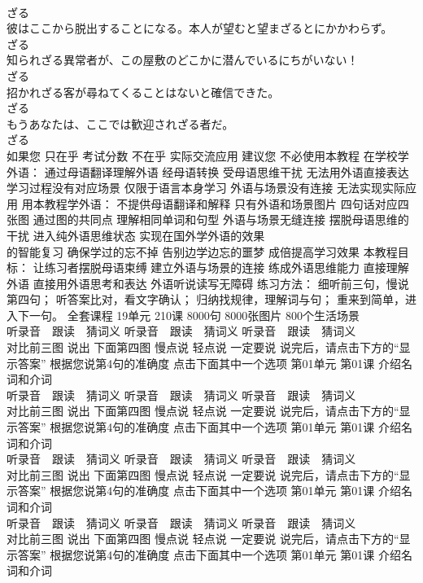 \documentclass[8pt]{extreport}
\begin{document}
\begin{CJK}{UTF8}{min}
\\	ざる
\\	彼はここから脱出することになる。本人が望むと望まざるとにかかわらず。	
\\	ざる
\\	知られざる異常者が、この屋敷のどこかに潜んでいるにちがいない！	
\\	ざる
\\	招かれざる客が尋ねてくることはないと確信できた。	
\\	ざる
\\	もうあなたは、ここでは歓迎されざる者だ。	
\\	ざる
\\	如果您 只在乎 考试分数 不在乎 实际交流应用 建议您 不必使用本教程 在学校学外语： 通过母语翻译理解外语 经母语转换 受母语思维干扰 无法用外语直接表达 学习过程没有对应场景 仅限于语言本身学习 外语与场景没有连接 无法实现实际应用 用本教程学外语： 不提供母语翻译和解释 只有外语和场景图片 四句话对应四张图 通过图的共同点 理解相同单词和句型 外语与场景无缝连接 摆脱母语思维的干扰 进入纯外语思维状态 实现在国外学外语的效果 
\\	的智能复习 确保学过的忘不掉 告别边学边忘的噩梦 成倍提高学习效果 本教程目标： 让练习者摆脱母语束缚 建立外语与场景的连接 练成外语思维能力 直接理解外语 直接用外语思考和表达 外语听说读写无障碍 练习方法： 细听前三句，慢说第四句； 听答案比对，看文字确认； 归纳找规律，理解词与句； 重来到简单，进入下一句。	全套课程 19单元 210课 8000句 8000张图片 800个生活场景
\\	听录音　跟读　猜词义 听录音　跟读　猜词义 听录音　跟读　猜词义 
\\	对比前三图 说出 下面第四图 慢点说 轻点说 一定要说 说完后，请点击下方的“显示答案”	根据您说第4句的准确度 点击下面其中一个选项 第01单元 第01课 介绍名词和介词
\\	听录音　跟读　猜词义 听录音　跟读　猜词义 听录音　跟读　猜词义 
\\	对比前三图 说出 下面第四图 慢点说 轻点说 一定要说 说完后，请点击下方的“显示答案”	根据您说第4句的准确度 点击下面其中一个选项 第01单元 第01课 介绍名词和介词
\\	听录音　跟读　猜词义 听录音　跟读　猜词义 听录音　跟读　猜词义 
\\	对比前三图 说出 下面第四图 慢点说 轻点说 一定要说 说完后，请点击下方的“显示答案”	根据您说第4句的准确度 点击下面其中一个选项 第01单元 第01课 介绍名词和介词
\\	听录音　跟读　猜词义 听录音　跟读　猜词义 听录音　跟读　猜词义 
\\	对比前三图 说出 下面第四图 慢点说 轻点说 一定要说 说完后，请点击下方的“显示答案”	根据您说第4句的准确度 点击下面其中一个选项 第01单元 第01课 介绍名词和介词

\end{CJK}
\end{document}
